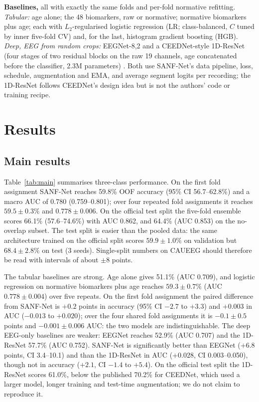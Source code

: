 \documentclass[conference]{IEEEtran}
\begin{document}
\textbf{Baselines,} all with exactly the same folds and per-fold normative refitting.
\textit{Tabular:} age alone; the 48 biomarkers, raw or normative; normative biomarkers plus age; each
with $L_2$-regularised logistic regression (LR; class-balanced, $C$ tuned by inner five-fold CV) and,
for the last, histogram gradient boosting (HGB). \textit{Deep, EEG from random crops:} EEGNet-8,2
\cite{lawhern2018eegnet} and a CEEDNet-style 1D-ResNet (four stages of two residual blocks on the raw
19 channels, age concatenated before the classifier, 2.3M parameters) \cite{kim2023caueeg}. Both use
SANF-Net's data pipeline, loss, schedule, augmentation and EMA, and average segment logits per
recording; the 1D-ResNet follows CEEDNet's design idea but is not the authors' code or training
recipe.

\section{Results}
\label{sec:results}

\subsection{Main results}
Table~\ref{tab:main} summarises three-class performance. On the first fold assignment SANF-Net reaches
59.8\% OOF accuracy (95\% CI 56.7--62.8\%) and a macro AUC of 0.780 (0.759--0.801); over four repeated
fold assignments it reaches $59.5\pm0.3\%$ and $0.778\pm0.006$. On the official test split the five-fold ensemble scores 66.1\%
(57.6--74.6\%) with AUC 0.862, and 64.4\% (AUC 0.853) on the no-overlap subset. The test split is
easier than the pooled data: the same architecture trained on the official split scores
$59.9\pm1.0\%$ on validation but $68.4\pm2.8\%$ on test (3 seeds). Single-split numbers on CAUEEG
should therefore be read with intervals of about $\pm 8$ points.

The tabular baselines are strong. Age alone gives 51.1\% (AUC 0.709), and logistic regression on
normative biomarkers plus age reaches $59.3\pm0.7\%$ (AUC $0.778\pm0.004$) over five repeats. On the
first fold assignment the paired difference from SANF-Net is $+0.2$ points in accuracy (95\% CI $-2.7$
to $+3.3$) and $+0.003$ in AUC ($-0.013$ to $+0.020$); over the four shared fold assignments it is $-0.1\pm0.5$ points and $-0.001\pm0.006$ AUC: the two models are indistinguishable. The
deep EEG-only baselines are weaker: EEGNet reaches 52.9\% (AUC 0.707) and the 1D-ResNet 57.7\% (AUC 0.752).
SANF-Net is significantly better than EEGNet ($+6.8$ points, CI 3.4--10.1) and than the 1D-ResNet in
AUC ($+0.028$, CI 0.003--0.050), though not in accuracy ($+2.1$, CI $-1.4$ to $+5.4$). On the official
test split the 1D-ResNet scores 61.0\%, below the published 70.2\% for CEEDNet, which used a larger
model, longer training and test-time augmentation; we do not claim to reproduce it.
\end{document}
